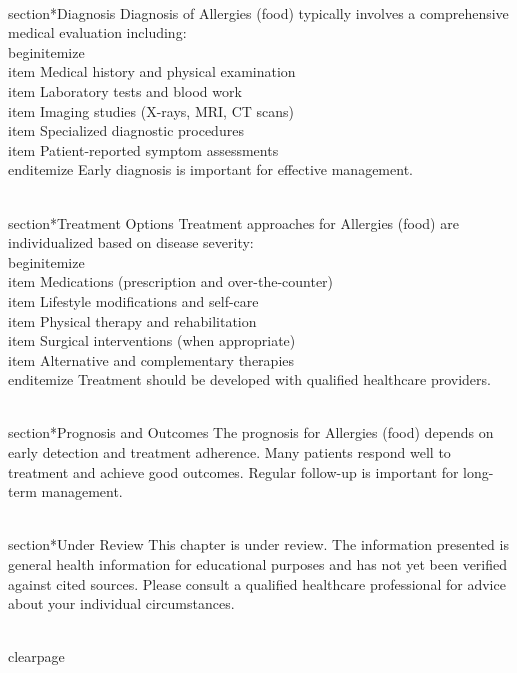 \\section*{Diagnosis}
Diagnosis of Allergies (food) typically involves a comprehensive medical evaluation including:
\\begin{itemize}
  \\item Medical history and physical examination
  \\item Laboratory tests and blood work
  \\item Imaging studies (X-rays, MRI, CT scans)
  \\item Specialized diagnostic procedures
  \\item Patient-reported symptom assessments
\\end{itemize}
Early diagnosis is important for effective management.

\\section*{Treatment Options}
Treatment approaches for Allergies (food) are individualized based on disease severity:
\\begin{itemize}
  \\item Medications (prescription and over-the-counter)
  \\item Lifestyle modifications and self-care
  \\item Physical therapy and rehabilitation
  \\item Surgical interventions (when appropriate)
  \\item Alternative and complementary therapies
\\end{itemize}
Treatment should be developed with qualified healthcare providers.

\\section*{Prognosis and Outcomes}
The prognosis for Allergies (food) depends on early detection and treatment adherence. Many patients respond well to treatment and achieve good outcomes. Regular follow-up is important for long-term management.

\\section*{Under Review}
This chapter is under review. The information presented is general health information for educational purposes and has not yet been verified against cited sources. Please consult a qualified healthcare professional for advice about your individual circumstances.

\\clearpage
